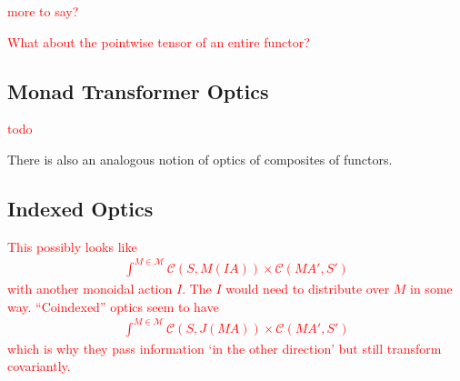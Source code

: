 \documentclass[11pt,a4paper]{article}
\theoremstyle{plain}
\theoremstyle{definition}
\newcommand{\C}{\mathscr{C}}
\newcommand{\M}{\mathscr{M}}
\newcommand{\todo}[1]{\textcolor{red}{\small #1}}
\begin{document}
\todo{more to say?}

\todo{What about the pointwise tensor of an entire functor?}

\subsection{Monad Transformer Optics}

\todo{todo}

There is also an analogous notion of optics of composites of functors.

\subsection{Indexed Optics}
\todo{
  This possibly looks like
  \begin{align*}
    \int^{M \in \M} \C(S, M(IA)) \times \C(M A', S')
  \end{align*}
  with another monoidal action $I$. The $I$ would need to distribute over $M$ in some way. ``Coindexed'' optics seem to have
  \begin{align*}
    \int^{M \in \M} \C(S, J(MA)) \times \C(M A', S')
  \end{align*}
  which is why they pass information `in the other direction' but still transform covariantly.
}
\end{document}
